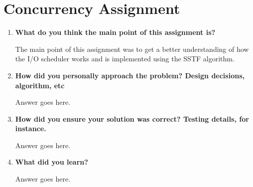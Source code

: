 \documentclass[letterpaper,10pt,titlepage,draftclsnofoot,onecolumn]{IEEEtran}
\begin{document}
\section{Concurrency Assignment}
\begin{enumerate}
\item \textbf{What do you think the main point of this assignment is?}

The main point of this assignment was to get a better understanding of how the I/O scheduler works and is implemented using the SSTF algorithm. \par

\item \textbf{How did you personally approach the problem? Design decisions, algorithm, etc}

Answer goes here.

\item \textbf{How did you ensure your solution was correct? Testing details, for instance.}

Answer goes here.

\item \textbf{What did you learn?}

Answer goes here.

\end{enumerate}

\nocite{*}



\end{document}
